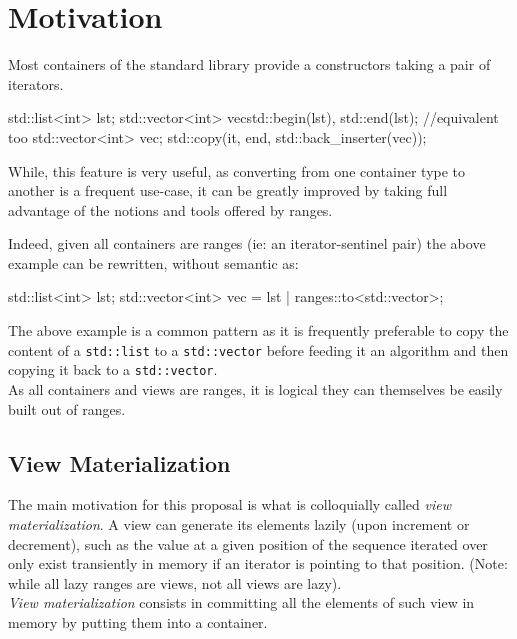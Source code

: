 \documentclass{wg21}
\newcommand{\cc}[1]{\texttt{#1}}
\begin{document}
\section{Motivation}

Most containers of the standard library provide a constructors taking a pair of iterators.

\begin{codeblock}
    std::list<int> lst;
    std::vector<int> vec{std::begin(lst), std::end(lst)};
    //equivalent too
    std::vector<int> vec;
    std::copy(it, end, std::back_inserter(vec));
\end{codeblock}

While, this feature is very useful, as converting from one container type to another is a frequent
use-case, it can be greatly improved by taking full advantage of the notions and tools offered by ranges.

Indeed, given all containers are ranges (ie: an iterator-sentinel pair) the above example can be rewritten, without semantic as:

\begin{codeblock}
    std::list<int> lst;
    std::vector<int> vec = lst | ranges::to<std::vector>;
\end{codeblock}


The above example is a common pattern as it is frequently preferable to copy the content of a \cc{std::list} to a \cc{std::vector} before feeding it an algorithm and then copying it back to a \cc{std::vector}.\\

As all containers and views are ranges, it is logical they can themselves be easily built out of ranges.

\subsection{View Materialization}

The main motivation for this proposal is what is colloquially called \emph{view materialization}.
A view can generate its elements lazily (upon increment or decrement), such as the value at a given position of the sequence
iterated over only exist transiently in memory if an iterator is pointing to that position.
(Note: while all lazy ranges are views, not all views are lazy).\\

\emph{View materialization} consists in committing all the elements of such view in memory by putting them into a container.
\end{document}
